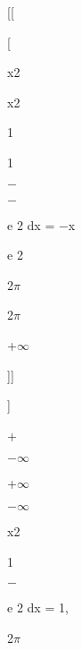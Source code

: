 \documentclass[a4paper,portrait,12pt]{article}
\begin{document}
[[


[





\begin{flushleft}
x2
\end{flushleft}


\begin{flushleft}
x2
\end{flushleft}


1


1


$-$


$-$


\begin{flushleft}
e 2 dx = $-$x
\end{flushleft}


\begin{flushleft}
e 2
\end{flushleft}


\begin{flushleft}
2$\pi$
\end{flushleft}


\begin{flushleft}
2$\pi$
\end{flushleft}





+$\infty$





]]


]





+


$-$$\infty$





+$\infty$


$-$$\infty$





\begin{flushleft}
x2
\end{flushleft}


1


$-$


\begin{flushleft}
e 2 dx = 1,
\end{flushleft}


\begin{flushleft}
2$\pi$
\end{flushleft}
\end{document}

